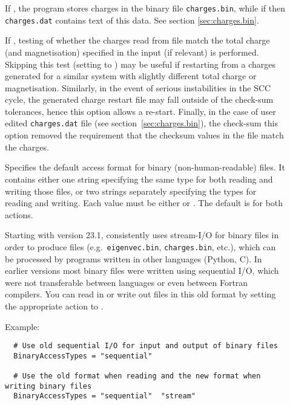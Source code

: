 \begin{description}
\item[] If , the program stores charges in the
  binary file \verb|charges.bin|, while if  then \verb|charges.dat|
  contains text of this data. See section \ref{sec:charges.bin}.

\item[] If , testing of whether the charges read from
  file match the total charge (and magnetisation) specified in the {\dftbp}
  input (if relevant) is performed. Skipping this test (setting to ) may
  be useful if restarting from a charges generated for a similar system with
  slightly different total charge or magnetisation. Similarly, in the event of
  serious instabilities in the SCC cycle, the generated charge restart file may
  fall outside of the check-sum tolerances, hence this option allows a
  re-start. Finally, in the case of user edited \verb|charges.dat| file (see
  section~\ref{sec:charges.bin}), the check-sum this option removed the
  requirement that the checksum values in the file match the charges.

\item[\label{sec:dftbp.Options.BinaryAccessTypes}]
  Specifies the default access format for binary (non-human-readable) files. It
  contains either one string specifying the same type for both reading and
  writing those files, or two strings separately specifying the types for
  reading and writing. Each value must be either  or
  . The default is  for both actions.

  Starting with version 23.1, \dftbp{} consistently uses stream-I/O for binary
  files in order to produce files (e.g.\ \verb|eigenvec.bin|,
  \verb|charges.bin|, etc.), which can be processed by programs written in other
  languages (Python, C). In earlier versions most binary files were written
  using sequential I/O, which were not transferable between languages or even
  between Fortran compilers. You can read in or write out files in this old
  format by setting the appropriate action to .

  Example:
\begin{verbatim}
  # Use old sequential I/O for input and output of binary files
  BinaryAccessTypes = "sequential"

  # Use the old format when reading and the new format when writing binary files
  BinaryAccessTypes = "sequential"  "stream"
\end{verbatim}


\end{description}


